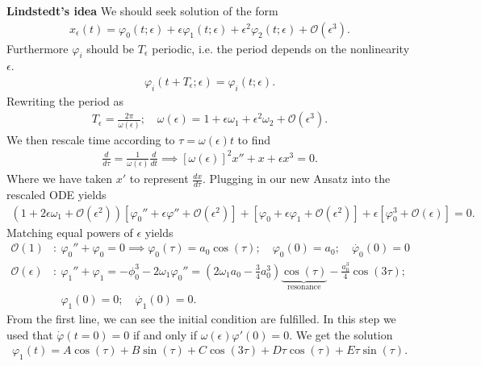 \begin{ex}
\noindent
\textbf{Lindstedt's idea} We should seek solution of the form
\begin{align}
	x_{\epsilon}(t) = \varphi_0(t;\epsilon) + \epsilon \varphi_1 (t;\epsilon) + \epsilon^2 \varphi_2(t;\epsilon) + \mathcal{O}(\epsilon^3).
\end{align}
Furthermore $\varphi_i$ should be $T_\epsilon$ periodic, i.e. the period depends on the nonlinearity $\epsilon$.
\begin{align}
	\varphi_i(t+T_\epsilon; \epsilon) = \varphi_i(t;\epsilon).
\end{align}
Rewriting the period as
\begin{align}
	T_\epsilon = \frac{2 \pi }{\omega(\epsilon)}; \quad \omega(\epsilon) = 1 + \epsilon \omega_1 + \epsilon^2 \omega_2 + \mathcal{O}(\epsilon^3).
\end{align}
We then rescale time according to $\tau = \omega(\epsilon) t$ to find
\begin{align}
	\frac{d}{d\tau} = \frac{1}{\omega(\epsilon)} \frac{d}{dt} \implies 
	\boxed{[\omega(\epsilon)]^2 x'' + x + \epsilon x^3 = 0.}
\end{align}
Where we have taken $x'$ to represent $\frac{dx}{d\tau}$. Plugging in our new Ansatz into the rescaled ODE yields
\begin{align}
	\left( 1 + 2 \epsilon \omega_1 + \mathcal{O}(\epsilon^2) \right) \left[ \varphi_0'' + \epsilon \varphi'' + \mathcal{O}(\epsilon^2) \right] + \left[ \varphi_0 + \epsilon \varphi_1 + \mathcal{O}(\epsilon^2) \right] + \epsilon \left[\varphi_0^{3} + \mathcal{O}(\epsilon) \right] = 0.
\end{align}
Matching equal powers of $\epsilon$ yields
\begin{align}
	\mathcal{O}(1)&:\ \varphi_0'' + \varphi_0 = 0 \implies \varphi_0(\tau) = a_0 \cos(\tau);\quad \varphi_0(0)=a_0;\quad \dot{\varphi_0}(0) = 0 \\
	\mathcal{O}(\epsilon)&:\ \varphi_1'' + \varphi_1 = - \phi_0^{3} - 2\omega_1 \varphi_{0}'' = 
	\left(2 \omega_1 a_0 - \frac{3}{4}a_0^{3}\right) \underbrace{\cos (\tau)}_{ \textrm{resonance} } - \frac{a_0^{3}}{4} \cos(3 \tau); \\
			     &\phantom{:}\ \varphi_1(0)=0; \quad \dot{\varphi_1}(0) = 0. 
\end{align}
From the first line, we can see the initial condition are fulfilled. In this step we used that $\dot{\varphi}(t=0) = 0$ if and only if $\omega(\epsilon)\varphi '(0) = 0$. We get the solution
\begin{align}
	\varphi_1(t) = A \cos(\tau) + B \sin(\tau) + C \cos(3\tau) + D\tau \cos(\tau) + E \tau \sin(\tau).

\end{align}
\end{ex}
